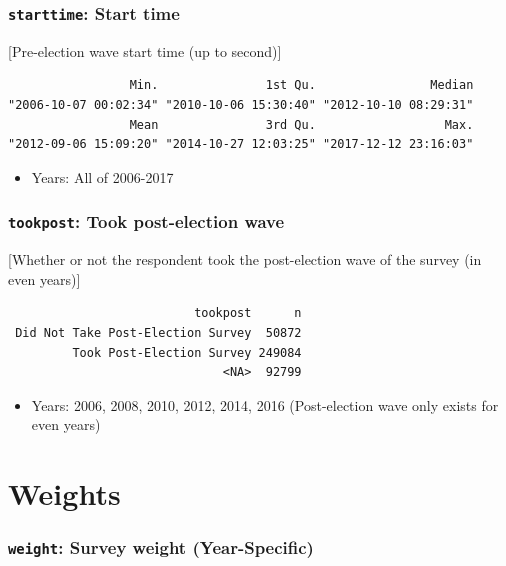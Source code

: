 \documentclass[10pt,article,oneside]{memoir}
\theoremstyle{definition}
\begin{document}
\hypertarget{starttime-start-time}{%
\subsubsection{\texorpdfstring{\texttt{starttime}: Start
time}{starttime: Start time}}\label{starttime-start-time}}

{[}Pre-election wave start time (up to second){]}

\begin{verbatim}
                 Min.               1st Qu.                Median 
"2006-10-07 00:02:34" "2010-10-06 15:30:40" "2012-10-10 08:29:31" 
                 Mean               3rd Qu.                  Max. 
"2012-09-06 15:09:20" "2014-10-27 12:03:25" "2017-12-12 23:16:03" 
\end{verbatim}

\begin{itemize}
\tightlist
\item
  Years: All of 2006-2017
\end{itemize}

\hypertarget{tookpost-took-post-election-wave}{%
\subsubsection{\texorpdfstring{\texttt{tookpost}: Took post-election
wave}{tookpost: Took post-election wave}}\label{tookpost-took-post-election-wave}}

{[}Whether or not the respondent took the post-election wave of the
survey (in even years){]}

\begin{verbatim}
                          tookpost      n
 Did Not Take Post-Election Survey  50872
         Took Post-Election Survey 249084
                              <NA>  92799
\end{verbatim}

\begin{itemize}
\tightlist
\item
  Years: 2006, 2008, 2010, 2012, 2014, 2016 (Post-election wave only
  exists for even years)
\end{itemize}

\hypertarget{weights}{%
\section{Weights}\label{weights}}

\hypertarget{weight-survey-weight-year-specific}{%
\subsubsection{\texorpdfstring{\texttt{weight}: Survey weight
(Year-Specific)}{weight: Survey weight (Year-Specific)}}\label{weight-survey-weight-year-specific}}
\end{document}
